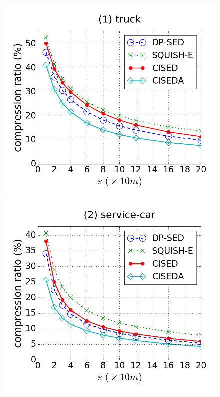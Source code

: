 \begin{figure}[tb!]
\centering
\includegraphics[scale = 0.250]{figures/Exp-cr-epsilon-truck.png}
\includegraphics[scale = 0.250]{figures/Exp-cr-epsilon-service.png}

\end{figure}

